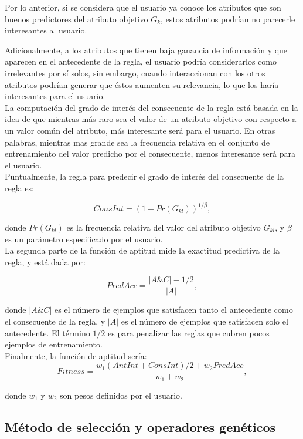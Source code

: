 Por lo anterior, si se considera que el usuario ya conoce los atributos que son buenos predictores del atributo objetivo $G_k$, estos atributos podrían no parecerle interesantes al usuario.

Adicionalmente, a los atributos que tienen baja ganancia de información y que aparecen en el antecedente de la regla, el usuario podría considerarlos como irrelevantes por sí solos, sin embargo, cuando interaccionan con los otros atributos podrían generar que éstos aumenten su relevancia, lo que los haría interesantes para el usuario.
\\
La computación del grado de interés del consecuente de la regla está basada en la idea de que mientras más raro sea el valor de un atributo objetivo con respecto a un valor común del atributo, más interesante será para el usuario. En otras palabras, mientras mas grande sea la frecuencia relativa en el conjunto de entrenamiento del valor predicho por el consecuente, menos interesante será para el usuario.
\\
Puntualmente, la regla para predecir el grado de interés del consecuente de la regla es:

\begin{equation} \label{eq:5}
ConsInt= (1-Pr(G_{kl}))^{1/\beta},
\end{equation}

donde $Pr(G_{kl})$ es la frecuencia relativa del valor del atributo objetivo $G_{kl}$, y $\beta$ es un parámetro especificado por el usuario.
\\
La segunda parte de la función de aptitud mide la exactitud predictiva de la regla, y está dada por:

\begin{equation} \label{eq:6}
PredAcc= \frac{|A\&C|-1/2}{|A|},
\end{equation}

donde $|A\&C|$ es el número de ejemplos que satisfacen tanto el antecedente como el consecuente de la regla, y $|A|$ es el número de ejemplos que satisfacen solo el antecedente. El término $1/2$ es para penalizar las reglas que cubren pocos ejemplos de entrenamiento.
\\
Finalmente, la función de aptitud sería:
\begin{equation} \label{eq:7}
Fitness= \frac{w_1(AntInt+ConsInt)/2+w_2PredAcc}{w_1+w_2},
\end{equation}

donde $w_1$ y $w_2$ son pesos definidos por el usuario.

\subsection{Método de selección y operadores genéticos}

